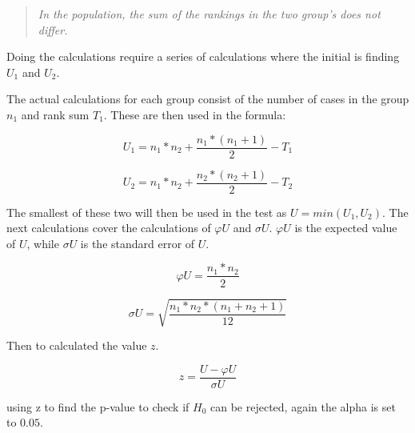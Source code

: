 \begin{quote}
    \textit{In the population, the sum of the rankings in the two group's does not differ.}
\end{quote}

Doing the calculations require a series of calculations where the initial is finding $U_1$ and $U_2$.

The actual calculations for each group consist of the number of cases in the group $n_1$ and rank sum $T_1$. These are then used in the formula:

\begin{equation}
    U_1 = n_1*n_2+\frac{n_1*(n_1+1)}{2}-T_1  
\end{equation}

\begin{equation}
    U_2 = n_1*n_2+\frac{n_2*(n_2+1)}{2}-T_2
\end{equation}

The smallest of these two will then be used in the test as $U=min(U_1,U_2)$. The next calculations cover the calculations of $\varphi U$ and $\sigma U$. $\varphi U$ is the expected value of $U$, while $\sigma U$ is the standard error of $U$.

\begin{equation}
    \varphi U = \frac{n_1*n_2}{2}
\end{equation}

\begin{equation}
    \sigma U = \sqrt{\frac{n_1*n_2*(n_1+n_2+1)}{12}}
\end{equation}

Then to calculated the value $z$.

\begin{equation}
    z = \frac{U-\varphi U}{\sigma U}
\end{equation}

using z to find the p-value to check if $H_0$ can be rejected, again the alpha is set to $0.05$. 

